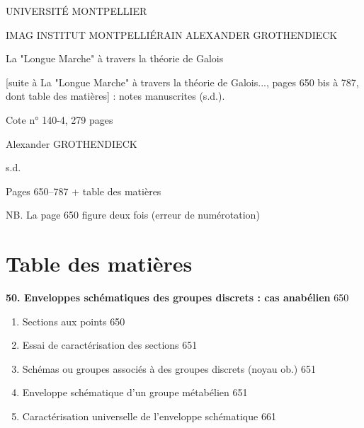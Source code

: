 

UNIVERSITÉ MONTPELLIER

IMAG
INSTITUT MONTPELLIÉRAIN
ALEXANDER GROTHENDIECK

La "Longue Marche" à travers la théorie de Galois

[suite à La "Longue Marche" à travers la théorie de Galois..., pages 650 bis à 787, dont
table des matières] : notes manuscrites (s.d.).

Cote n° 140-4, 279 pages

Alexander GROTHENDIECK

s.d.

\newpage


\newpage
\thispagestyle{empty}

Pages 650--787 + table des matières

NB. La page 650 figure deux fois (erreur de numérotation)

\newpage


\chapter*{Table des matières}

\noindent \textbf{50. Enveloppes schématiques des groupes discrets : cas anabélien} \hfill 650
\begin{enumerate}
\item[1)] Sections aux points \hfill 650
\item[2)] Essai de caractérisation des sections \hfill 651
\item[3)] Schémas ou groupes associés à des groupes discrets (noyau ob.) \hfill 651
\item[4)] Enveloppe schématique d'un groupe métabélien \hfill 651
\item[5)] Caractérisation universelle de l'enveloppe schématique \hfill 661
\end{enumerate}

